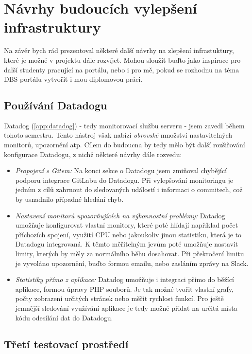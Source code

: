 \section{Návrhy budoucích vylepšení infrastruktury}

Na závěr bych rád prezentoval některé další návrhy na zlepšení infrastuktury, které je možné v projektu dále rozvíjet. Mohou sloužit buďto jako inspirace pro další studenty pracující na portálu, nebo i pro mě, pokud se rozhodnu na téma DBS portálu vytvořit i mou diplomovou práci.

\subsection{Používání Datadogu}

Datadog (\ref{app:datadog}) - tedy monitorovací službu serveru - jsem zavedl během tohoto semestru. Tento nástroj však nabízí \emph{obrovské} množství nastavitelných monitorů, upozornění atp. Cílem do budoucna by tedy mělo být další rozšiřování konfigurace Datadogu, z nichž některé návrhy dále rozvedu:
\begin{itemize}
	\item \emph{Propojení s Gitem:} Na konci sekce o Datadogu jsem zmiňoval chybějící podporu integrace GitLabu do Datadogu. Při vylepšování monitoringu je jedním z cílů zahrnout do sledovaných událostí i informaci o commitech, což by usnadnilo případné hledání chyb.
	\item \emph{Nastavení monitorů upozorňujících na výkonnostní problémy:} Datadog umožňuje konfigurovat vlastní monitory, které poté hlídají například počet příchozích spojení, využití CPU nebo jakoukoliv jinou statistiku, která je to Datadogu integrovaná. K těmto měřitelným jevům poté umožňuje nastavit limity, kterých by měly za normálního běhu dosahovat. Při překročení limitu je vyvoláno upozornění, buďto formou emailu, nebo zasláním zprávy na Slack.
	\item \emph{Statistiky přímo z aplikace:} Datadog umožňuje i integraci přímo do běžící aplikace, formou úpravy PHP souborů. Je tak možné tvořit vlastní grafy, počty zobrazení určitých stránek nebo měřit rychlost funkcí. Pro ještě jemnější sledování využívání aplikace je tedy možné přidat na určitá místa kódu odesílání dat do Datadogu.
\end{itemize}

\subsection{Třetí testovací prostředí}

